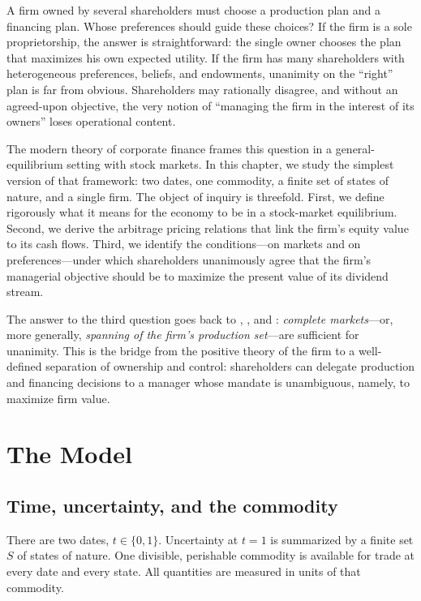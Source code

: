 \documentclass[11pt,a4paper,oneside]{book}
\theoremstyle{plain}
\theoremstyle{definition}
\theoremstyle{remark}
\numberwithin{equation}{chapter}
\begin{document}
A firm owned by several shareholders must choose a production plan and a financing plan.
Whose preferences should guide these choices?
If the firm is a sole proprietorship, the answer is straightforward: the single owner chooses the plan that maximizes his own expected utility.
If the firm has many shareholders with heterogeneous preferences, beliefs, and endowments, unanimity on the ``right'' plan is far from obvious.
Shareholders may rationally disagree, and without an agreed-upon objective, the very notion of ``managing the firm in the interest of its owners'' loses operational content.

The modern theory of corporate finance frames this question in a general-equilibrium setting with stock markets.
In this chapter, we study the simplest version of that framework: two dates, one commodity, a finite set of states of nature, and a single firm.
The object of inquiry is threefold.
First, we define rigorously what it means for the economy to be in a stock-market equilibrium.
Second, we derive the arbitrage pricing relations that link the firm's equity value to its cash flows.
Third, we identify the conditions---on markets and on preferences---under which shareholders unanimously agree that the firm's managerial objective should be to maximize the present value of its dividend stream.

The answer to the third question goes back to \citet{Fisher1930}, \citet{Dreze1974}, and \citet{GrossmanHart1979}: \emph{complete markets}---or, more generally, \emph{spanning of the firm's production set}---are sufficient for unanimity.
This is the bridge from the positive theory of the firm to a well-defined separation of ownership and control: shareholders can delegate production and financing decisions to a manager whose mandate is unambiguous, namely, to maximize firm value.

\section{The Model}
\label{sec:model}

\subsection{Time, uncertainty, and the commodity}

There are two dates, $t \in \{0,1\}$.
Uncertainty at $t=1$ is summarized by a finite set $S$ of states of nature.
One divisible, perishable commodity is available for trade at every date and every state.
All quantities are measured in units of that commodity.
\end{document}
